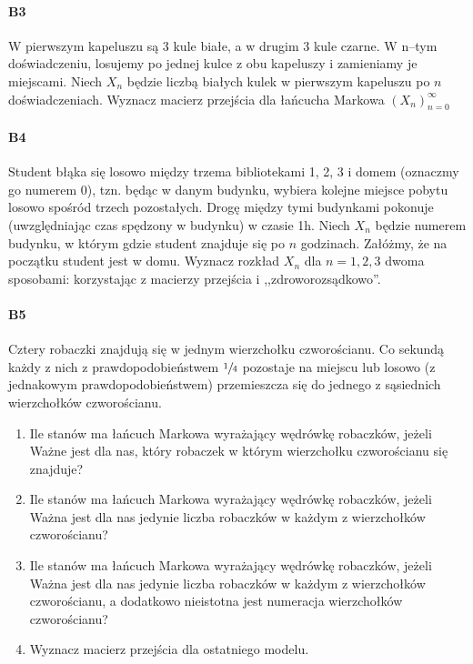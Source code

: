 \documentclass[a4paper,12pt]{article}
\theoremstyle{definition}%
\theoremstyle{definition}
\theoremstyle{problem}
\begin{document}
\paragraph{B3} W pierwszym kapeluszu są 3 kule białe, a w drugim 3 kule czarne. W n–tym doświadczeniu, losujemy po jednej kulce z obu kapeluszy i zamieniamy je miejscami. Niech $X_n$ będzie liczbą białych kulek w pierwszym kapeluszu po $n$ doświadczeniach. Wyznacz macierz przejścia dla łańcucha Markowa $(X_n)^\infty_{n=0}$

\paragraph{B4} Student błąka się losowo między trzema bibliotekami 1, 2, 3 i domem (oznaczmy go numerem 0), tzn. będąc w danym budynku, wybiera kolejne miejsce pobytu losowo spośród trzech pozostałych. Drogę między tymi budynkami pokonuje (uwzględniając czas spędzony w budynku) w czasie 1h. Niech $X_n$ będzie numerem budynku, w którym gdzie student znajduje się po $n$ godzinach. Załóżmy, że na początku student jest w domu. Wyznacz rozkład $X_n$ dla $n = 1, 2, 3$ dwoma sposobami: korzystając z macierzy przejścia i ,,zdroworozsądkowo”.

\paragraph{B5} Cztery robaczki znajdują się w jednym wierzchołku czworościanu. Co sekundą każdy z nich z prawdopodobieństwem $\sfrac{1}{4}$ pozostaje na miejscu lub losowo (z jednakowym prawdopodobieństwem) przemieszcza się do jednego z sąsiednich wierzchołków czworościanu.
\begin{enumerate}[label=\alph*)]
\item Ile stanów ma łańcuch Markowa wyrażający wędrówkę robaczków, jeżeli Ważne jest dla nas, który robaczek w którym wierzchołku czworościanu się znajduje?
\item Ile stanów ma łańcuch Markowa wyrażający wędrówkę robaczków, jeżeli Ważna jest dla nas jedynie liczba robaczków w każdym z wierzchołków czworościanu?
\item Ile stanów ma łańcuch Markowa wyrażający wędrówkę robaczków, jeżeli Ważna jest dla nas jedynie liczba robaczków w każdym z wierzchołków czworościanu, a dodatkowo nieistotna jest numeracja wierzchołków czworościanu?
\item Wyznacz macierz przejścia dla ostatniego modelu.
\end{enumerate}
\end{document}
